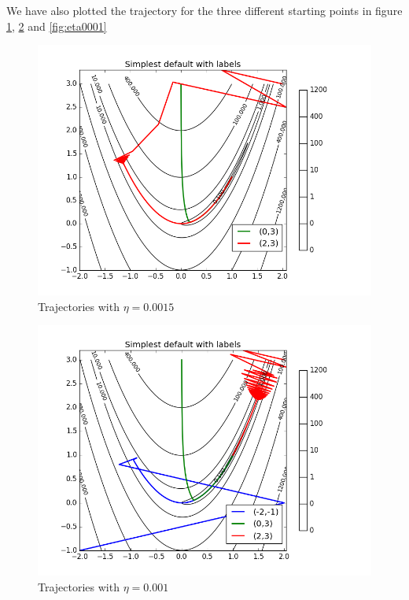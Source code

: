 \documentclass[11pt]{article}
\begin{document}
We have also plotted the trajectory for the three different starting points in figure \ref{fig:eta0015}, \ref{fig:eta001} and \ref{fig:eta0001}

\begin{figure}[H]
	\centering
		\includegraphics[trim={1cm 1cm 0.5cm 0.7cm},clip, scale=0.5]{images/exercise2_4_1.png}
		\caption{Trajectories with $\eta = 0.0015$}
	\label{fig:eta0015}
\end{figure}

\begin{figure}[H]
	\centering
	\includegraphics[trim={1cm 1cm 0.5cm 0.7cm},clip, scale=0.5]{images/exercise2_4_2.png}
	\caption{Trajectories with $\eta = 0.001$}
	\label{fig:eta001}
\end{figure}
\end{document}
